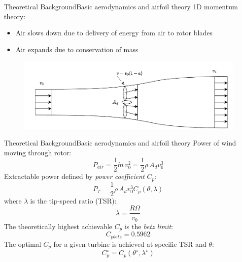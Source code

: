 
\begin{frame}{Theoretical Background}{Basic aerodynamics and airfoil theory}
	1D momentum theory:
	\begin{itemize}
		\item Air slows down due to delivery of energy from air to rotor blades
		\item Air expands due to conservation of mass
	\end{itemize}
	\begin{figure}[ht]
		\centering
		\includegraphics[width=1\linewidth]{../Graphics/FlowThroughRotor.pdf}
		\label{fig:betz}
	\end{figure}
\end{frame}


\begin{frame}{Theoretical Background}{Basic aerodynamics and airfoil theory}
	Power of wind moving through rotor:
	\begin{equation} \label{eq:power}
		P_{air} = \dfrac{1}{2} \dot{m} \, v_0^2 = \dfrac{1}{2}\rho \, A_d v_0^3
	\end{equation}
	Extractable power defined by \textit{power coefficient} $ C_p $:
	\begin{equation}\label{eq:power_w_Cp}
		P_{T} = \dfrac{1}{2} \rho \, A_d v_0^3 C_p(\theta, \lambda)
	\end{equation}
	where $ \lambda $ is the tip-speed ratio (TSR):
	\begin{equation}\label{key}
		\lambda = \dfrac{R \Omega}{v_0}
	\end{equation}
	The theoretically highest achievable $ C_p $ is the \textit{betz limit}:
	\begin{equation}\label{eq:betzlimit}
		C_{pbetz} = 0.5962
	\end{equation}
	The optimal $ C_p $ for a given turbine is achieved at specific TSR and $ \theta $:
	\begin{equation}\label{eq:cp_optimal}
		C_p^\star = C_p(\theta^\star, \lambda^\star)
	\end{equation}
\end{frame}

